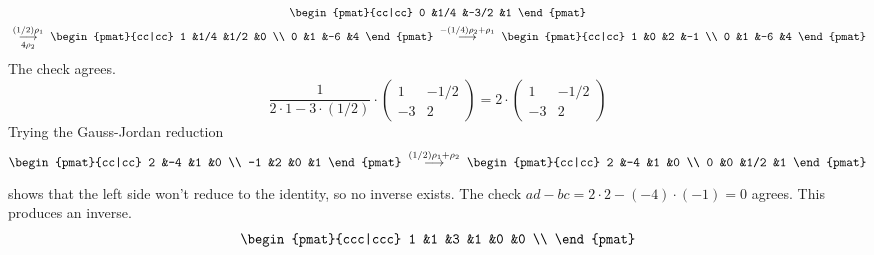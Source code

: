 \begin{exercises}
\begin{answer}
\begin{exparts}
\begin{multline*}
\begin{pmat}{cc|cc}
              0  &1/4  &-3/2  &1
            \end{pmat}                       \\
            \;\grstep[4\rho_2]{(1/2)\rho_1}\;
            \begin{pmat}{cc|cc}
              1  &1/4   &1/2   &0  \\
              0  &1     &-6    &4
            \end{pmat}                         
            \;\grstep{-(1/4)\rho_2+\rho_1}\;
            \begin{pmat}{cc|cc}
              1  &0     &2     &-1 \\
              0  &1     &-6    &4
            \end{pmat}
          \end{multline*}
          The check agrees.
          \begin{equation*}
            \frac{1}{2\cdot 1-3\cdot (1/2)}\cdot
            \begin{pmatrix}
              1  &-1/2  \\
              -3 &2
            \end{pmatrix}
            =2\cdot
            \begin{pmatrix}
              1  &-1/2  \\
              -3 &2
            \end{pmatrix}
          \end{equation*}
        \partsitem Trying the Gauss-Jordan reduction
          \begin{equation*}
            \begin{pmat}{cc|cc}
              2  &-4  &1  &0  \\
             -1  &2   &0  &1 
            \end{pmat}
            \;\grstep{(1/2)\rho_1+\rho_2}\;
            \begin{pmat}{cc|cc}
              2  &-4  &1   &0  \\
              0  &0   &1/2 &1 
            \end{pmat}
          \end{equation*}
          shows that the left side won't reduce to the identity, so no inverse
          exists.
          The check $ad-bc=2\cdot 2-(-4)\cdot (-1)=0$ agrees.
        \partsitem This produces an inverse.
          \begin{multline*}
            \begin{pmat}{ccc|ccc}
              1  &1  &3  &1  &0  &0  \\ 

\end{pmat}
\end{multline*}
\end{exparts}
\end{answer}
\end{exercises}
